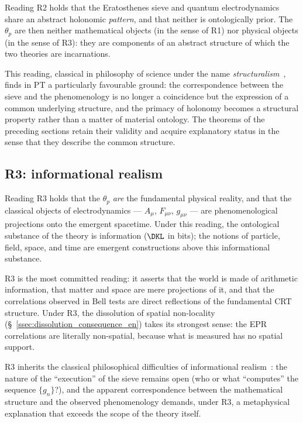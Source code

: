 Reading R2 holds that the Eratosthenes sieve and quantum
electrodynamics share an abstract holonomic \emph{pattern}, and
that neither is ontologically prior. The $\theta_p$ are then
neither mathematical objects (in the sense of R1) nor physical
objects (in the sense of R3): they are components of an abstract
structure of which the two theories are incarnations.

This reading, classical in philosophy of science under the name
\emph{structuralism}~\cite{Belot1998,Maudlin2011}, finds in PT a
particularly favourable ground: the correspondence between the
sieve and the phenomenology is no longer a coincidence but the
expression of a common underlying structure, and the primacy of
holonomy becomes a structural property rather than a matter of
material ontology. The theorems of the preceding sections retain
their validity and acquire explanatory status in the sense that
they describe the common structure.

\subsection{R3: informational realism}
\label{ssec:R3_en}

Reading R3 holds that the $\theta_p$ \emph{are} the fundamental
physical reality, and that the classical objects of
electrodynamics --- $A_\mu$, $F_{\mu\nu}$, $g_{\mu\nu}$ --- are
phenomenological projections onto the emergent spacetime. Under
this reading, the ontological substance of the theory is
information ($\DKL$ in bits); the notions of particle, field,
space, and time are emergent constructions above this
informational substance.

R3 is the most committed reading: it asserts that the world is
made of arithmetic information, that matter and space are mere
projections of it, and that the correlations observed in Bell
tests are direct reflections of the fundamental CRT structure.
Under R3, the dissolution of spatial non-locality
(\S~\ref{ssec:dissolution_consequence_en}) takes its strongest
sense: the EPR correlations are literally non-spatial, because
what is measured has no spatial support.

R3 inherits the classical philosophical difficulties of
informational realism~\cite{Healey2007}: the nature of the
``execution'' of the sieve remains open (who or what
``computes'' the sequence $\{g_n\}$?), and the apparent
correspondence between the mathematical structure and the
observed phenomenology demands, under R3, a metaphysical
explanation that exceeds the scope of the theory itself.

